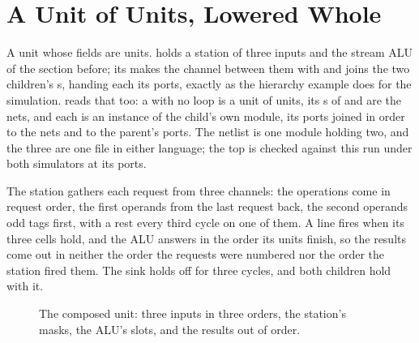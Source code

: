 \section{A Unit of Units, Lowered Whole}
\label{sec:x-compose}

A unit whose fields are units.  holds a station of three
inputs and the stream ALU of the section before; its 
makes the channel between them with  and joins the two
children's s, handing each its ports, exactly as the
hierarchy example does for the simulation. \code{\#[lower]} reads
that  too: a  with no loop is a unit of units,
its s of  and  are the nets, and
each  is an instance of the child's own
module, its ports joined in order to the nets and to the parent's
ports. The netlist is one module holding two, and the three are one
file in either language; the top is checked against this run under
both simulators at its ports.

The station gathers each request from three channels: the operations
come in request order, the first operands from the last request back,
the second operands odd tags first, with a rest every third cycle on
one of them. A line fires when its three cells hold, and the ALU
answers in the order its units finish, so the results come out in
neither the order the requests were numbered nor the order the
station fired them. The sink holds off for three cycles, and both
children hold with it.

\begin{figure}[htbp]
\centering

\caption{The composed unit: three inputs in three orders, the
station's masks, the ALU's slots, and the results out of order.}
\label{fig:x-compose}
\end{figure}




